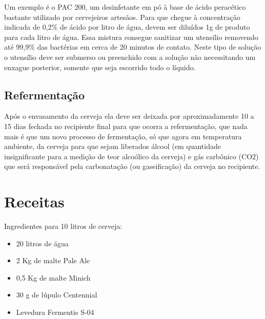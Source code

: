 Um exemplo é o PAC 200, um desinfetante em pó à base de ácido peracético bastante utilizado por cervejeiros artesãos. Para que chegue à concentração indicada de 0,2\% de ácido por litro de água, devem ser diluídos 1g de produto para cada litro de água. Essa mistura consegue sanitizar um utensílio removendo até 99,9\% das bactérias em cerca de 20 minutos de contato. Neste tipo de solução o utensílio deve ser submerso ou preenchido com a solução não necessitando um enxague posterior, somente que seja escorrido todo o líquido.

\subsection{Refermentação}
Após o envasamento da cerveja ela deve ser deixada por aproximadamente 10 a 15 dias fechada no recipiente final para que ocorra a refermentação, que nada mais é que um novo processo de fermentação, só que agora em temperatura ambiente, da cerveja para que sejam liberados álcool (em quantidade insignificante para a medição de teor alcoólico da cerveja) e gás carbônico (CO2) que será responsável pela carbonatação (ou gaseificação) da cerveja no recipiente.

\section{Receitas}

Ingredientes para 10 litros de cerveja:

 \begin{itemize}
    \item 20 litros de água
    \item 2 Kg de malte Pale Ale
    \item 0,5 Kg de malte Minich
    \item 30 g de lúpulo Centennial
    \item Levedura Fermentis S-04
 \end{itemize}
